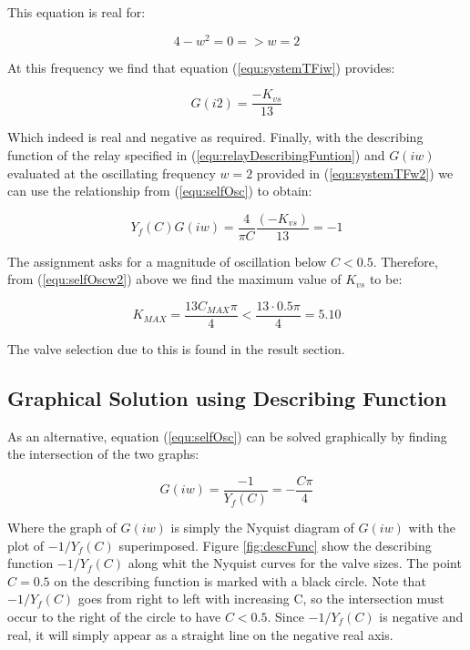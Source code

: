\documentclass[a4paper, titlepage]{article}
\begin{document}
This equation is real for:

\begin{equation}
4-w^2 = 0 => w=2
\label{equ:systemTFreal}
\end{equation}

At this frequency we find that equation (\ref{equ:systemTFiw}) provides:

\begin{equation}
G(i2) = \frac{-K_{vs}}{13}
\label{equ:systemTFw2}
\end{equation}

Which indeed is real and negative as required.
Finally, with the describing function of the relay specified in  (\ref{equ:relayDescribingFuntion}) and $G(iw)$ evaluated at the oscillating frequency $w=2$ provided in (\ref{equ:systemTFw2}) we can use the relationship from (\ref{equ:selfOsc}) to obtain:

\begin{equation}
Y_{f}(C)G(iw) = \frac{4}{\pi C}\frac{(-K_{vs})}{13} = -1
\label{equ:selfOscw2}
\end{equation}

The assignment asks for a magnitude of oscillation below $C < 0.5$.
Therefore, from (\ref{equ:selfOscw2}) above we find the maximum value of $K_{vs}$ to be:

\begin{equation}
K_{MAX} = \frac{13C_{MAX}\pi}{4} < \frac{13 \cdot 0.5\pi}{4}= 5.10
\label{equ:maximum_k}
\end{equation}

The valve selection due to this is found in the result section.

\subsection{Graphical Solution using Describing Function}

As an alternative, equation (\ref{equ:selfOsc}) can be solved graphically by finding the intersection of the two graphs:

\begin{equation}
G(iw) = \frac{-1}{Y_{f}(C)} = -\frac{C\pi}{4}
\end{equation}

Where the graph of $G(iw)$ is simply the Nyquist diagram of $G(iw)$ with the plot of $-1/Y_{f}(C)$ superimposed.
Figure \ref{fig:descFunc} show the describing function $-1/Y_{f}(C)$ along whit the Nyquist curves for the valve sizes.
The point $C=0.5$ on the describing function is marked with a black circle.
Note that $-1/Y_{f}(C)$ goes from right to left with increasing C, so the intersection must occur to the right of the circle to have $C < 0.5$.
Since $-1/Y_{f}(C)$ is negative and real, it will simply appear as a straight line on the negative real axis. 
\end{document}
